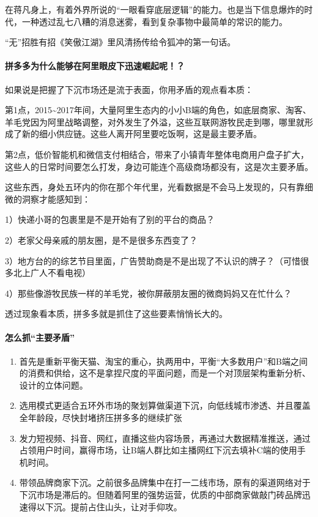 \documentclass[letterpaper,11pt,english]{sphinxmanual}
\begin{document}
在蒋凡身上，有着外界所说的“一眼看穿底层逻辑”的能力。也是当下信息爆炸的时代，一种透过乱七八糟的消息迷雾，看到复杂事物中最简单的常识的能力。

“无”招胜有招《笑傲江湖》里风清扬传给令狐冲的第一句话。


\paragraph{拼多多为什么能够在阿里眼皮下迅速崛起呢！？}
\label{\detokenize{chapter_experience/taobao:id1}}
如果说是把握了下沉市场还是流于表面，你用矛盾的观点看本质：

第1点，2015\textasciitilde{}2017年间，大量阿里生态内的小小B端的角色，如底层商家、淘客、羊毛党因为阿里战略调整，对外发生了外溢，这些互联网游牧民走到哪，哪里就形成了新的细小供应链。这些人离开阿里要吃饭啊，这是最主要矛盾。

第2点，低价智能机和微信支付相结合，带来了小镇青年整体电商用户盘子扩大，这些人的日常时间要怎么打发，身边可能连个高级商场都没有，这是次主要矛盾。

这些东西，身处五环内的你在那个年代里，光看数据是不会马上发现的，只有靠细微的洞察才能感知到：

1）快递小哥的包裹里是不是开始有了别的平台的商品？

2）老家父母亲戚的朋友圈，是不是很多东西变了？

3）地方台的的综艺节目里面，广告赞助商是不是出现了不认识的牌子？（可惜很多北上广人不看电视）

4）那些像游牧民族一样的羊毛党，被你屏蔽朋友圈的微商妈妈又在忙什么？

透过现象看本质，拼多多就是抓住了这些要素悄悄长大的。


\paragraph{怎么抓“主要矛盾”}
\label{\detokenize{chapter_experience/taobao:id2}}\begin{enumerate}
%
\item {} 
首先是重新平衡天猫、淘宝的重心，执两用中，平衡“大多数用户”和B端之间的消费和供给，这不是拿捏尺度的平面问题，而是一个对顶层架构重新分析、设计的立体问题。

\item {} 
选用模式更适合五环外市场的聚划算做渠道下沉，向低线城市渗透、并且覆盖全年龄段，尽快封堵挤压拼多多的继续扩张

\item {} 
发力短视频、抖音、网红，直播这些内容场景，再通过大数据精准推送，通过占领用户时间，赢得市场，让B端人群比如主播网红下沉去填补C端的使用手机时间。

\item {} 
带领品牌商家下沉。之前很多品牌集中在打一二线市场，原有的渠道网络对于下沉市场是滞后的。但随着阿里的强势运营，优质的中部商家做敲门砖品牌迅速得以下沉。提前占住山头，让对手仰攻。

\end{enumerate}
\end{document}
